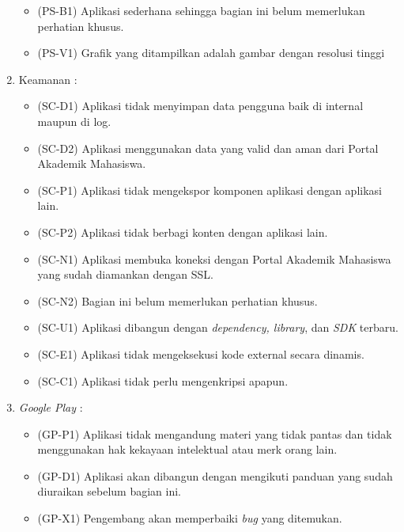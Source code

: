\begin{enumerate}
\begin{itemize}
        \item (PS-B1) Aplikasi sederhana sehingga bagian ini belum memerlukan perhatian khusus.
        \item (PS-V1) Grafik yang ditampilkan adalah gambar dengan resolusi tinggi 
    \end{itemize}
    \item Keamanan : 
    \begin{itemize}
        \item (SC-D1) Aplikasi tidak menyimpan data pengguna baik di internal maupun di log.
        \item (SC-D2) Aplikasi menggunakan data yang valid dan aman dari Portal Akademik Mahasiswa.
        \item (SC-P1) Aplikasi tidak mengekspor komponen aplikasi dengan aplikasi lain.
        \item (SC-P2) Aplikasi tidak berbagi konten dengan aplikasi lain.
        \item (SC-N1) Aplikasi membuka koneksi dengan Portal Akademik Mahasiswa yang sudah diamankan dengan SSL.
        \item (SC-N2) Bagian ini belum memerlukan perhatian khusus.
        \item (SC-U1) Aplikasi dibangun dengan \textit{dependency, library}, dan \textit{SDK} terbaru.
        \item (SC-E1) Aplikasi tidak mengeksekusi kode external secara dinamis.
        \item (SC-C1) Aplikasi tidak perlu mengenkripsi apapun.
    \end{itemize}
    \item \textit{Google Play} : 
    \begin{itemize}
        \item (GP-P1) Aplikasi tidak mengandung materi yang tidak pantas dan tidak menggunakan hak kekayaan intelektual atau merk orang lain.
        \item (GP-D1) Aplikasi akan dibangun dengan mengikuti panduan yang sudah diuraikan sebelum bagian ini.
        \item (GP-X1) Pengembang akan memperbaiki \textit{bug} yang ditemukan.
    \end{itemize}
\end{enumerate}

